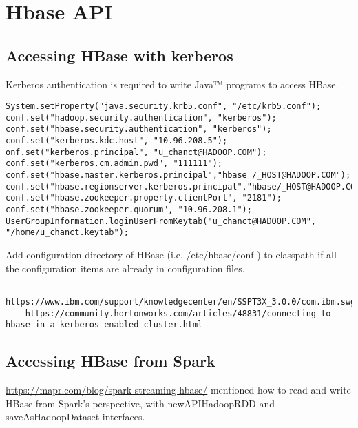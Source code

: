 \section{Hbase API}

\subsection{Accessing HBase with kerberos}

Kerberos authentication is required to write Java™ programs to access HBase.

\begin{verbatim}
System.setProperty("java.security.krb5.conf", "/etc/krb5.conf");
conf.set("hadoop.security.authentication", "kerberos");
conf.set("hbase.security.authentication", "kerberos");
conf.set("kerberos.kdc.host", "10.96.208.5");
onf.set("kerberos.principal", "u_chanct@HADOOP.COM");
conf.set("kerberos.cm.admin.pwd", "111111");
conf.set("hbase.master.kerberos.principal","hbase /_HOST@HADOOP.COM"); 
conf.set("hbase.regionserver.kerberos.principal","hbase/_HOST@HADOOP.COM"); 
conf.set("hbase.zookeeper.property.clientPort", "2181");
conf.set("hbase.zookeeper.quorum", "10.96.208.1");   
UserGroupInformation.loginUserFromKeytab("u_chanct@HADOOP.COM", "/home/u_chanct.keytab"); 
\end{verbatim}

Add configuration directory of HBase (i.e. /etc/hbase/conf ) 
to classpath if all the configuration items are already in configuration files.



\begin{verbatim}
    https://www.ibm.com/support/knowledgecenter/en/SSPT3X_3.0.0/com.ibm.swg.im.infosphere.biginsights.admin.doc/doc/kerberos_hbase.html
    https://community.hortonworks.com/articles/48831/connecting-to-hbase-in-a-kerberos-enabled-cluster.html

\end{verbatim}


\subsection{Accessing HBase from Spark}

\href{Spark Streaming with HBase}{https://mapr.com/blog/spark-streaming-hbase/}
mentioned how to read and write HBase from Spark's perspective, 
with newAPIHadoopRDD and saveAsHadoopDataset interfaces.




